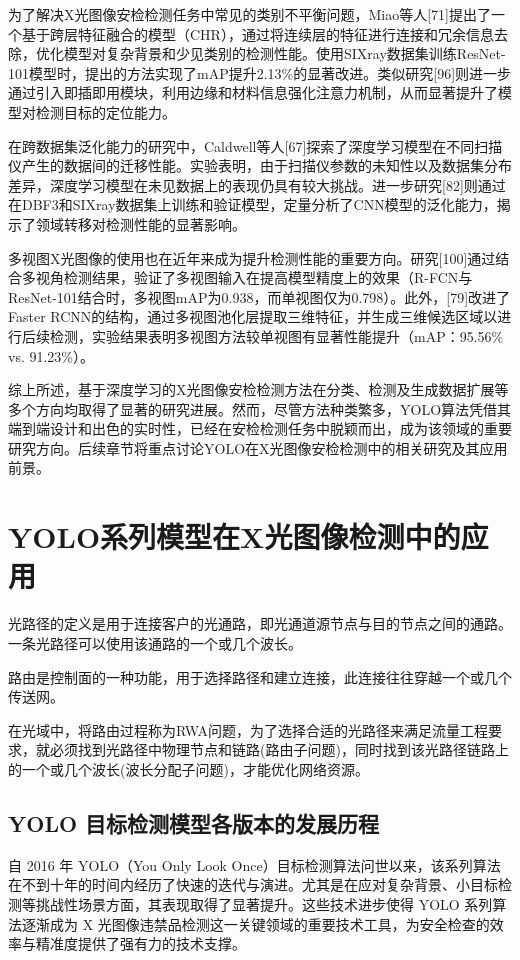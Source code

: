 \documentclass[11pt,twocolumn]{ctexart}
\begin{document}
为了解决X光图像安检检测任务中常见的类别不平衡问题，Miao等人[71]提出了一个基于跨层特征融合的模型（CHR），通过将连续层的特征进行连接和冗余信息去除，优化模型对复杂背景和少见类别的检测性能。使用SIXray数据集训练ResNet-101模型时，提出的方法实现了mAP提升2.13\%的显著改进。类似研究[96]则进一步通过引入即插即用模块，利用边缘和材料信息强化注意力机制，从而显著提升了模型对检测目标的定位能力。

在跨数据集泛化能力的研究中，Caldwell等人[67]探索了深度学习模型在不同扫描仪产生的数据间的迁移性能。实验表明，由于扫描仪参数的未知性以及数据集分布差异，深度学习模型在未见数据上的表现仍具有较大挑战。进一步研究[82]则通过在DBF3和SIXray数据集上训练和验证模型，定量分析了CNN模型的泛化能力，揭示了领域转移对检测性能的显著影响。

多视图X光图像的使用也在近年来成为提升检测性能的重要方向。研究[100]通过结合多视角检测结果，验证了多视图输入在提高模型精度上的效果（R-FCN与ResNet-101结合时，多视图mAP为0.938，而单视图仅为0.798）。此外，[79]改进了Faster RCNN的结构，通过多视图池化层提取三维特征，并生成三维候选区域以进行后续检测，实验结果表明多视图方法较单视图有显著性能提升（mAP：95.56\% vs. 91.23\%）。

综上所述，基于深度学习的X光图像安检检测方法在分类、检测及生成数据扩展等多个方向均取得了显著的研究进展。然而，尽管方法种类繁多，YOLO算法凭借其端到端设计和出色的实时性，已经在安检检测任务中脱颖而出，成为该领域的重要研究方向。后续章节将重点讨论YOLO在X光图像安检检测中的相关研究及其应用前景。


\section{YOLO系列模型在X光图像检测中的应用}
光路径的定义是用于连接客户的光通路，即光通道源节点与目的节点之间的通路。一条光路径可以使用该通路的一个或几个波长。

路由是控制面的一种功能，用于选择路径和建立连接，此连接往往穿越一个或几个传送网。

在光域中，将路由过程称为RWA问题，为了选择合适的光路径来满足流量工程要求，就必须找到光路径中物理节点和链路(路由子问题)，同时找到该光路径链路上的一个或几个波长(波长分配子问题)，才能优化网络资源。

\subsection{YOLO 目标检测模型各版本的发展历程}

自 2016 年 YOLO（You Only Look Once）目标检测算法问世以来，该系列算法在不到十年的时间内经历了快速的迭代与演进。尤其是在应对复杂背景、小目标检测等挑战性场景方面，其表现取得了显著提升。这些技术进步使得 YOLO 系列算法逐渐成为 X 光图像违禁品检测这一关键领域的重要技术工具，为安全检查的效率与精准度提供了强有力的技术支撑。
\end{document}

